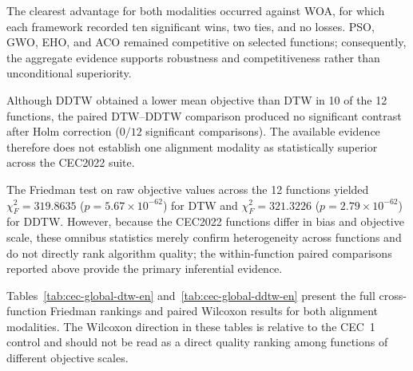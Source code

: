 The clearest advantage for both modalities occurred against WOA, for which each
framework recorded ten significant wins, two ties, and no losses. PSO, GWO, EHO,
and ACO remained competitive on selected functions; consequently, the
aggregate evidence supports robustness and competitiveness rather than
unconditional superiority.

Although DDTW obtained a lower mean objective than DTW in 10 of the 12
functions, the paired DTW--DDTW comparison produced no significant contrast
after Holm correction ($0/12$ significant comparisons). The available evidence
therefore does not establish one alignment modality as statistically superior
across the CEC2022 suite.

The Friedman test on raw objective values across the 12 functions yielded
$\chi_F^2=319.8635$ ($p=5.67\times10^{-62}$) for DTW and
$\chi_F^2=321.3226$ ($p=2.79\times10^{-62}$) for DDTW. However, because the
CEC2022 functions differ in bias and objective scale, these omnibus statistics
merely confirm heterogeneity across functions and do not directly rank
algorithm quality; the within-function paired comparisons reported above
provide the primary inferential evidence.

Tables~\ref{tab:cec-global-dtw-en} and~\ref{tab:cec-global-ddtw-en} present
the full cross-function Friedman rankings and paired Wilcoxon results for both
alignment modalities. The Wilcoxon direction in these tables is relative to the
CEC~1 control and should not be read as a direct quality ranking among
functions of different objective scales.

